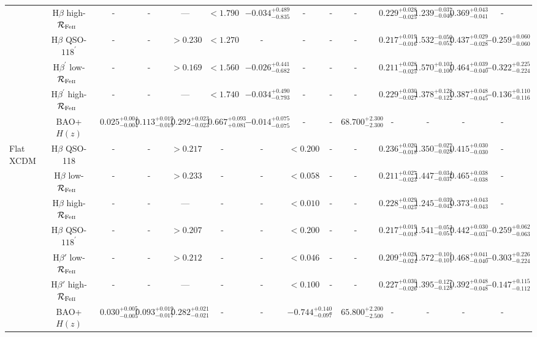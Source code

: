 \documentclass[a4paper,fleqn,usenatbib]{mnras}
\newcommand{\rfe}{${\cal R}_{\rm{Fe\textsc{ii}}}$}
\begin{document}
\begin{sidewaystable*}
\begin{adjustbox}{angle=0}
\begin{threeparttable}
{\begin{tabular}{lcccccccccccccc}
& H$\beta$ high-\rfe\ &-&-& --- & $< 1.790$ & $-0.034^{+0.489}_{-0.835}$ & - & - & - & $0.229^{+0.028}_{-0.025}$ & $1.239^{-0.037}_{-0.040}$ & $0.369^{+0.043}_{-0.041}$ & -\\
& H$\beta$ QSO-$118^{\prime}$ &-&-& $> 0.230$ & $< 1.270$ & - & - & - & - & $0.217^{+0.019}_{-0.016}$ & $1.532^{-0.050}_{-0.052}$ & $0.437^{+0.029}_{-0.028}$ & $-0.259^{+0.060}_{-0.060}$\\
& H$\beta^{\prime}$ low-\rfe\ &-&-& $> 0.169$ & $< 1.560$ & $-0.026^{+0.441}_{-0.682}$ & - & - & - & $0.211^{+0.028}_{-0.025}$ & $1.570^{+0.103}_{-0.100}$ & $0.464^{+0.039}_{-0.040}$ & $-0.322^{+0.225}_{-0.224}$\\
& H$\beta^{\prime}$ high-\rfe\ &-&-& --- & $< 1.740$ & $-0.034^{+0.490}_{-0.793}$ & - & - & - & $0.229^{+0.030}_{-0.027}$ & $1.378^{+0.128}_{-0.122}$ & $0.387^{+0.048}_{-0.045}$ & $-0.136^{+0.110}_{-0.116}$\\
& BAO+$H(z)$& $0.025^{+0.004}_{-0.004}$ & $0.113^{+0.019}_{-0.019}$ & $0.292^{+0.023}_{-0.023}$ & $0.667^{+0.093}_{+0.081}$ & $-0.014^{+0.075}_{-0.075}$ & - & - &$68.700^{+2.300}_{-2.300}$&-&-&-&-\\
\hline
Flat XCDM & H$\beta$ QSO-118 &-&-& $> 0.217$ & - & - & $< 0.200$ & - & - & $0.236^{+0.020}_{-0.018}$ & $1.350^{-0.027}_{-0.028}$ & $0.415^{+0.030}_{-0.030}$ & -\\
& H$\beta$ low-\rfe\ &-&-& $> 0.233$ & - & - & $< 0.058$ & - & - & $0.211^{+0.027}_{-0.023}$ & $1.447^{-0.034}_{-0.037}$ & $0.465^{+0.038}_{-0.038}$ & -\\
& H$\beta$ high-\rfe\ &-&-& --- & - & - & $< 0.010$ & - & - & $0.228^{+0.029}_{-0.025}$ & $1.245^{-0.039}_{-0.042}$ & $0.373^{+0.043}_{-0.043}$ & -\\
& H$\beta$ QSO-$118^{\prime}$ &-&-& $> 0.207$ & - & - & $< 0.200$ & - & - & $0.217^{+0.019}_{-0.018}$ & $1.541^{-0.053}_{-0.054}$ & $0.442^{+0.030}_{-0.031}$ & $-0.259^{+0.062}_{-0.063}$\\
& H$\beta{\prime}$ low-\rfe\ &-&-& $> 0.212$ & - & - & $< 0.046$ & - & - & $0.209^{+0.028}_{-0.024}$ & $1.572^{-0.101}_{-0.101}$ & $0.468^{+0.041}_{-0.040}$ & $-0.303^{+0.226}_{-0.224}$\\
& H$\beta{\prime}$ high-\rfe\ &-&-& --- & - & - & $< 0.100$ & - & - & $0.227^{+0.030}_{-0.026}$ & $1.395^{-0.127}_{-0.128}$ & $0.392^{+0.048}_{-0.048}$ & $-0.147^{+0.115}_{-0.112}$\\
& BAO+$H(z)$ & $0.030^{+0.005}_{-0.005}$ & $0.093^{+0.019}_{-0.017}$ & $0.282^{+0.021}_{-0.021}$ & - & - & $-0.744^{+0.140}_{-0.097}$ & - &$65.800^{+2.200}_{-2.500}$& - & - & - &-\\

\end{tabular}}
\end{threeparttable}
\end{adjustbox}
\end{sidewaystable*}
\end{document}
